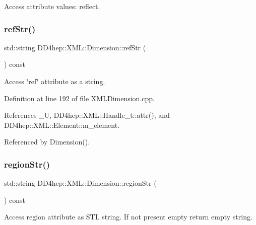 Access attribute values\+: reflect. 

\hypertarget{struct_d_d4hep_1_1_x_m_l_1_1_dimension_af5a76fd13bfe67a92860726785d30ef7}{}\label{struct_d_d4hep_1_1_x_m_l_1_1_dimension_af5a76fd13bfe67a92860726785d30ef7} 
\subsubsection{\texorpdfstring{ref\+Str()}{refStr()}}
{\footnotesize\ttfamily std\+::string D\+D4hep\+::\+X\+M\+L\+::\+Dimension\+::ref\+Str (\begin{DoxyParamCaption}{ }\end{DoxyParamCaption}) const}



Access \char`\"{}ref\char`\"{} attribute as a string. 



Definition at line 192 of file X\+M\+L\+Dimension.\+cpp.



References \+\_\+U, D\+D4hep\+::\+X\+M\+L\+::\+Handle\+\_\+t\+::attr(), and D\+D4hep\+::\+X\+M\+L\+::\+Element\+::m\+\_\+element.



Referenced by Dimension().

\hypertarget{struct_d_d4hep_1_1_x_m_l_1_1_dimension_a69b88308f9c24cfb84d4bb7194528425}{}\label{struct_d_d4hep_1_1_x_m_l_1_1_dimension_a69b88308f9c24cfb84d4bb7194528425} 
\subsubsection{\texorpdfstring{region\+Str()}{regionStr()}}
{\footnotesize\ttfamily std\+::string D\+D4hep\+::\+X\+M\+L\+::\+Dimension\+::region\+Str (\begin{DoxyParamCaption}{ }\end{DoxyParamCaption}) const}



Access region attribute as S\+TL string. If not present empty return empty string. 



